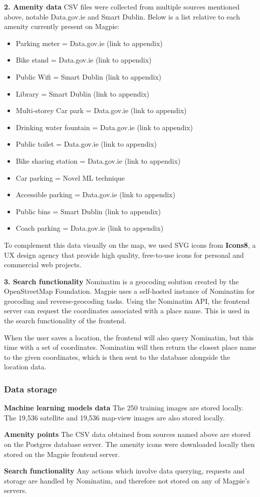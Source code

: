 \textbf{2. Amenity data}
CSV files were collected from multiple sources mentioned above, notable
Data.gov.ie and Smart Dublin. Below is a list relative to each amenity currently
present on Magpie:
\begin{itemize}
    \item Parking meter = Data.gov.ie (link to appendix)
    \item Bike stand = Data.gov.ie (link to appendix)
    \item Public Wifi = Smart Dublin (link to appendix)
    \item Library = Smart Dublin (link to appendix)
    \item Multi-storey Car park = Data.gov.ie (link to appendix)
    \item Drinking water fountain = Data.gov.ie (link to appendix)
    \item Public toilet = Data.gov.ie (link to appendix)
    \item Bike sharing station = Data.gov.ie (link to appendix)
    \item Car parking = Novel ML technique
    \item Accessible parking = Data.gov.ie (link to appendix)
    \item Public bins = Smart Dublin (link to appendix)
    \item Coach parking = Data.gov.ie (link to appendix)
\end{itemize}
To complement this data visually on the map, we used SVG icons from
\textbf{Icons8}, a UX design agency that provide high quality, free-to-use icons
for personal and commercial web projects.

\textbf{3. Search functionality}
Nominatim is a geocoding solution created by the OpenStreetMap Foundation.
Magpie uses a self-hosted instance of Nominatim for geocoding and
reverse-geocoding tasks. Using the Nominatim API, the frontend server can
request the coordinates associated with a place name. This is used in the search
functionality of the frontend.

When the user saves a location, the frontend will also query Nominatim, but this
time with a set of coordinates. Nominatim will then return the closest place
name to the given coordinates, which is then sent to the database alongside the
location data.

\subsubsection{Data storage}
\textbf{Machine learning models data}
The 250 training images are stored locally.
The 19,536 satellite and 19,536 map-view images are also stored locally.

\textbf{Amenity points}
The CSV data obtained from sources named above are stored on the Postgres database server.
The amenity icons were downloaded locally then stored on the Magpie frontend server.

\textbf{Search functionality}
Any actions which involve data querying, requests and storage are handled by Nominatim, and therefore not stored on any of Magpie's servers.
